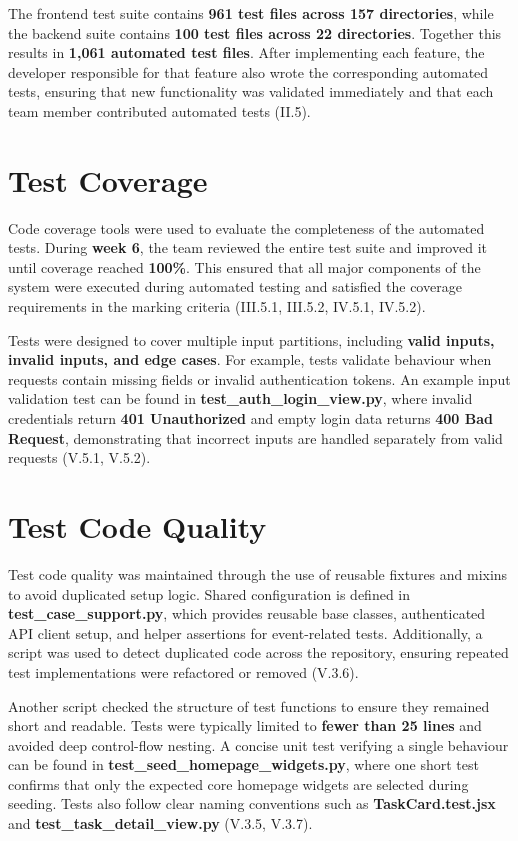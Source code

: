 The frontend test suite contains \textbf{961 test files across 157 directories}, while the backend suite contains \textbf{100 test files across 22 directories}. Together this results in \textbf{1,061 automated test files}. After implementing each feature, the developer responsible for that feature also wrote the corresponding automated tests, ensuring that new functionality was validated immediately and that each team member contributed automated tests (II.5).

\section{Test Coverage}

Code coverage tools were used to evaluate the completeness of the automated tests. During \textbf{week 6}, the team reviewed the entire test suite and improved it until coverage reached \textbf{100\%}. This ensured that all major components of the system were executed during automated testing and satisfied the coverage requirements in the marking criteria (III.5.1, III.5.2, IV.5.1, IV.5.2).

Tests were designed to cover multiple input partitions, including \textbf{valid inputs, invalid inputs, and edge cases}. For example, tests validate behaviour when requests contain missing fields or invalid authentication tokens. An example input validation test can be found in \textbf{test\_auth\_login\_view.py}, where invalid credentials return \textbf{401 Unauthorized} and empty login data returns \textbf{400 Bad Request}, demonstrating that incorrect inputs are handled separately from valid requests (V.5.1, V.5.2).

\section{Test Code Quality}

Test code quality was maintained through the use of reusable fixtures and mixins to avoid duplicated setup logic. Shared configuration is defined in \textbf{test\_case\_support.py}, which provides reusable base classes, authenticated API client setup, and helper assertions for event-related tests. Additionally, a script was used to detect duplicated code across the repository, ensuring repeated test implementations were refactored or removed (V.3.6).

Another script checked the structure of test functions to ensure they remained short and readable. Tests were typically limited to \textbf{fewer than 25 lines} and avoided deep control-flow nesting. A concise unit test verifying a single behaviour can be found in \textbf{test\_seed\_homepage\_widgets.py}, where one short test confirms that only the expected core homepage widgets are selected during seeding. Tests also follow clear naming conventions such as \textbf{TaskCard.test.jsx} and \textbf{test\_task\_detail\_view.py} (V.3.5, V.3.7).


